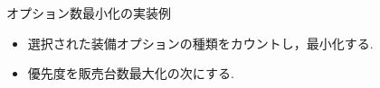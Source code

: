 \documentclass[dvipdfmx, 11pt,]{beamer}
\begin{document}
\begin{frame}{オプション数最小化の実装例}
\begin{block}{}
 \begin{itemize}
  \item 選択された装備オプションの種類をカウントし，最小化する.
  \item 優先度を販売台数最大化の次にする.
 \end{itemize}
\end{block}
  
\end{frame}

\end{document}
